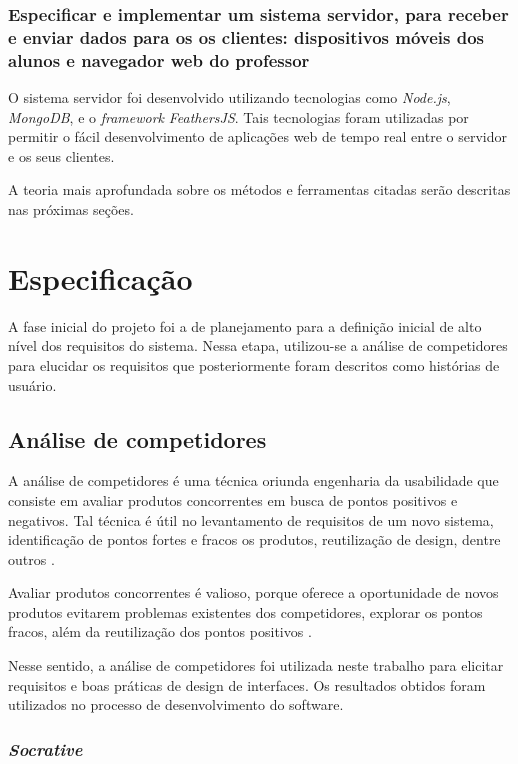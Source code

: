 \subsubsection{Especificar e implementar um sistema servidor, para receber e
    enviar dados para os os clientes: dispositivos móveis dos alunos e navegador
    web do professor}

O sistema servidor foi desenvolvido utilizando tecnologias como \textit{Node.js}, \textit{MongoDB}, e o \textit{framework} \textit{FeathersJS}.
Tais tecnologias foram utilizadas por permitir o fácil desenvolvimento de aplicações web de tempo real entre o servidor e os seus clientes.

A teoria mais aprofundada sobre os métodos e ferramentas citadas serão descritas nas próximas seções.

\section{Especificação}

A fase inicial do projeto foi a de planejamento para a definição inicial de alto nível dos
requisitos do sistema. Nessa etapa, utilizou-se a análise de competidores para elucidar
os requisitos que posteriormente foram descritos como histórias de usuário.

\subsection{Análise de competidores}

A análise de competidores é uma técnica oriunda engenharia da usabilidade
que consiste em avaliar produtos concorrentes em busca de pontos positivos e
negativos. Tal técnica é útil no levantamento de requisitos de um novo sistema,
identificação de pontos fortes e fracos os produtos, reutilização de design, dentre outros \cite{nielsen_usability}.

Avaliar produtos concorrentes é valioso, porque oferece a oportunidade de novos
produtos evitarem problemas existentes dos competidores, explorar os pontos
fracos, além da reutilização dos pontos positivos \cite{nielsen_usability}.

Nesse sentido, a análise de competidores foi utilizada neste trabalho para elicitar requisitos e boas práticas
de design de interfaces. %
Os resultados obtidos foram utilizados no processo de desenvolvimento do software.

\subsubsection{\textit{Socrative}}

